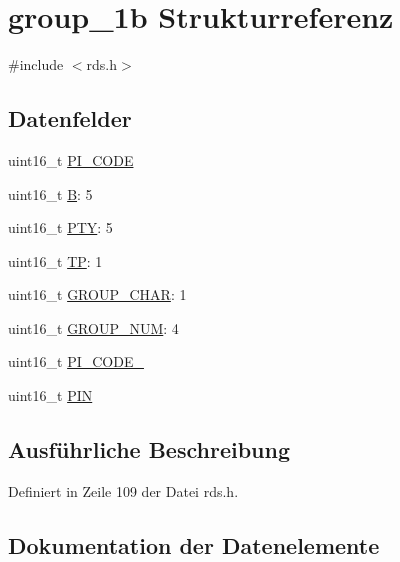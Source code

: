 \hypertarget{structgroup__1b}{}\section{group\+\_\+1b Strukturreferenz}
\label{structgroup__1b}


{\ttfamily \#include $<$rds.\+h$>$}

\subsection*{Datenfelder}
\begin{DoxyCompactItemize}
\item 
uint16\+\_\+t \hyperlink{structgroup__1b_a5cd9b1f6413028425796c1129aa8fd87}{P\+I\+\_\+\+C\+O\+D\+E}
\item 
uint16\+\_\+t \hyperlink{structgroup__1b_ae783bd90764c8455228772c025c064e4}{B}\+: 5
\item 
uint16\+\_\+t \hyperlink{structgroup__1b_a0474967478fbbc2c71b800d2e0132d45}{P\+T\+Y}\+: 5
\item 
uint16\+\_\+t \hyperlink{structgroup__1b_ab9e634c63b0d95a96716d5f6d7f06d72}{T\+P}\+: 1
\item 
uint16\+\_\+t \hyperlink{structgroup__1b_a66d4119990dc4c3e040a43885e9bb953}{G\+R\+O\+U\+P\+\_\+\+C\+H\+A\+R}\+: 1
\item 
uint16\+\_\+t \hyperlink{structgroup__1b_a9f692e9f76ee88348d426bcd4e9bc70b}{G\+R\+O\+U\+P\+\_\+\+N\+U\+M}\+: 4
\item 
uint16\+\_\+t \hyperlink{structgroup__1b_ae86fed9d07832a5c3cc36d5aaa064bcb}{P\+I\+\_\+\+C\+O\+D\+E\+\_}
\item 
uint16\+\_\+t \hyperlink{structgroup__1b_a23b9db30b873d9b45f435df66328a784}{P\+I\+N}
\end{DoxyCompactItemize}


\subsection{Ausführliche Beschreibung}


Definiert in Zeile 109 der Datei rds.\+h.



\subsection{Dokumentation der Datenelemente}
\hypertarget{structgroup__1b_ae783bd90764c8455228772c025c064e4}{}
